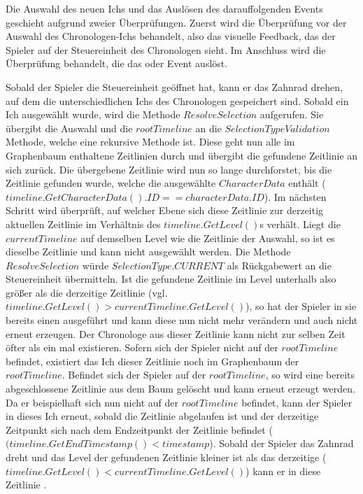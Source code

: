 Die Auswahl des neuen Ichs und das Auslösen des darauffolgenden Events geschieht aufgrund zweier Überprüfungen. Zuerst wird die Überprüfung vor der Auswahl des Chronologen-Ichs behandelt, also das visuelle Feedback, das der Spieler auf der Steuereinheit des Chronologen sieht. Im Anschluss wird die Überprüfung behandelt, die das  oder  Event auslöst.

Sobald der Spieler die Steuereinheit geöffnet hat, kann er das Zahnrad drehen, auf dem die unterschiedlichen Ichs des Chronologen gespeichert sind. Sobald ein Ich ausgewählt wurde, wird die  Methode $ResolveSelection$ aufgerufen. Sie übergibt die Auswahl und die $rootTimeline$ an die $SelectionTypeValidation$ Methode, welche eine rekursive Methode ist. Diese geht nun alle im Graphenbaum enthaltene Zeitlinien durch und übergibt die gefundene Zeitlinie an sich zurück. 
Die übergebene Zeitlinie wird nun so lange durchforstet, bis die Zeitlinie gefunden wurde, welche die ausgewählte $CharacterData$ enthält ($timeline.GetCharacterData().ID == characterData.ID$). Im nächsten Schritt wird überprüft, auf welcher Ebene sich diese Zeitlinie zur derzeitig aktuellen Zeitlinie im Verhältnis des $timeline.GetLevel()$s verhält. Liegt die $currentTimeline$ auf demselben Level wie die Zeitlinie der Auswahl, so ist es dieselbe Zeitlinie und kann nicht ausgewählt werden. Die Methode $ResolveSelection$ würde $SelectionType.CURRENT$ als Rückgabewert an die Steuereinheit übermitteln. Ist die gefundene Zeitlinie im Level unterhalb also größer als die derzeitige Zeitlinie (vgl. $timeline.GetLevel() > currentTimeline.GetLevel()$), so hat der Spieler in sie bereits einen  ausgeführt und kann diese nun nicht mehr verändern und auch nicht erneut erzeugen. Der Chronologe aus dieser Zeitlinie kann nicht zur selben Zeit öfter als ein mal existieren. Sofern sich der Spieler nicht auf der $rootTimeline$ befindet, existiert das Ich dieser Zeitlinie noch im Graphenbaum der $rootTimeline$. Befindet sich der Spieler auf der $rootTimeline$, so wird eine bereits abgeschlossene Zeitlinie aus dem Baum gelöscht und kann erneut erzeugt werden. Da er beispielhaft sich nun nicht auf der $rootTimeline$ befindet, kann der Spieler in dieses Ich erneut,  sobald die Zeitlinie abgelaufen ist und der derzeitige Zeitpunkt sich nach dem Endzeitpunkt der Zeitlinie befindet ($(timeline.GetEndTimestamp() < timestamp$).
Sobald der Spieler das Zahnrad dreht und das Level der gefundenen Zeitlinie kleiner ist als das derzeitige ($timeline.GetLevel() < currentTimeline.GetLevel()$) kann er in diese Zeitlinie .

